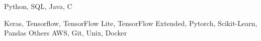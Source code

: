 
\begin{cvskills}
    {Python, SQL, Java, C} %

    {Keras, Tensorflow, TensorFlow Lite, TensorFlow Extended, Pytorch, Scikit-Learn, Pandas} %
  \cvskill
    {Others}
    {AWS, Git, Unix, Docker}
    
\end{cvskills}
